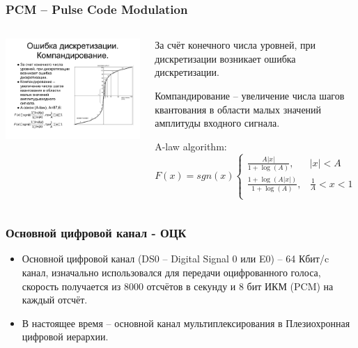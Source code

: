 \documentclass[utf8]{beamer}
\begin{document}
\begin{frame}
\frametitle{PCM -- Pulse Code Modulation}
\begin{columns}
\begin{block}{}
\centering
\includegraphics[width=1.1\textwidth]{pic/pcm-2.pdf}
\end{block}
\begin{block}{}
За счёт конечного числа уровней, при дискретизации возникает ошибка дискретизации.

Компандирование – увеличение числа шагов квантования в области малых значений амплитуды входного сигнала.

A-law algorithm:
\begin{displaymath}
F(x) = sgn(x) \left\{ \begin{array}{ll}
\frac{A |x|}{1 + \log (A)}, & |x| < A\\
\frac{1 + \log (A |x|)}{1 + \log (A)}, & \frac{1}{A} < x < 1\\
\end{array} \right.
\end{displaymath}
\end{block}
\end{columns}
\end{frame}
\begin{frame}
\frametitle{Основной цифровой канал - ОЦК}
\begin{itemize}
	\item Основной цифровой канал (DS0 – Digital Signal 0 или E0) – 64 Кбит/c канал, изначально использовался для передачи оцифрованного голоса, скорость получается из 8000 отсчётов в секунду и 8 бит ИКМ (PCM) на каждый отсчёт.
	\item В настоящее время – основной канал мультиплексирования в Плезиохронная цифровой иерархии.
\end{itemize}
\end{frame}
\end{document}
